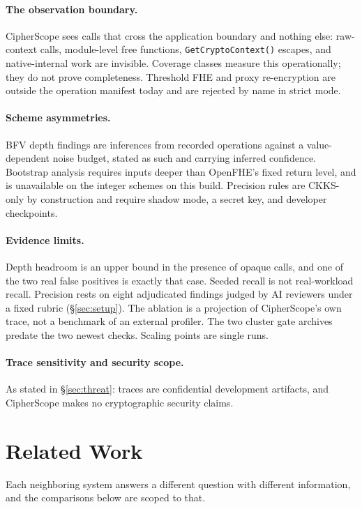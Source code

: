 \documentclass[sigconf,nonacm]{acmart}
\begin{document}
\paragraph{The observation boundary.} CipherScope sees calls that cross the
application boundary and nothing else: raw-context calls, module-level free
functions, \texttt{GetCryptoContext()} escapes, and native-internal work
are invisible. Coverage classes measure this operationally; they do not
prove completeness. Threshold FHE and proxy re-encryption are outside the
operation manifest today and are rejected by name in strict mode.

\paragraph{Scheme asymmetries.} BFV depth findings are inferences from
recorded operations against a value-dependent noise budget, stated as such
and carrying inferred confidence. Bootstrap analysis requires inputs deeper
than OpenFHE's fixed return level, and is unavailable on the integer
schemes on this build. Precision rules are CKKS-only by construction and
require shadow mode, a secret key, and developer checkpoints.

\paragraph{Evidence limits.} Depth headroom is an upper bound in the
presence of opaque calls, and one of the two real false positives is
exactly that case. Seeded recall is not real-workload recall. Precision
rests on eight adjudicated findings judged by AI reviewers under a fixed
rubric (\S\ref{sec:setup}). The ablation is a projection of CipherScope's
own trace, not a benchmark of an external profiler. The two cluster gate
archives predate the two newest checks. Scaling points are single runs.

\paragraph{Trace sensitivity and security scope.} As stated in
\S\ref{sec:threat}: traces are confidential development artifacts, and
CipherScope makes no cryptographic security claims.

\section{Related Work}
\label{sec:related}

Each neighboring system answers a different question with different
information, and the comparisons below are scoped to that.
\end{document}
